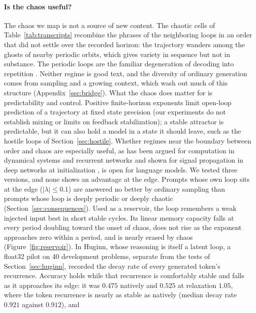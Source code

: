 \documentclass[11pt,letterpaper]{article}
\begin{document}
\paragraph{Is the chaos useful?} The chaos we map is not a source of new content. The chaotic cells of
Table~\ref{tab:transcripts} recombine the phrases of the neighboring loops in an order that did not settle over the recorded horizon: the
trajectory wanders among the ghosts of nearby periodic orbits, which gives variety in sequence but not in substance.
The periodic loops are the familiar degeneration of decoding into repetition
\cite{holtzman2019degeneration,xu2022loop}. Neither regime is good text, and the diversity of ordinary generation
comes from sampling and a growing context, which wash out much of this structure (Appendix~\ref{sec:bridge}). What
the chaos does matter for is predictability and control. Positive finite-horizon exponents limit open-loop
prediction of a trajectory at fixed state precision (our experiments do not establish mixing or limits on feedback
stabilization); a stable attractor is predictable, but it can also hold a model in a state it should leave, such as the hostile loops of Section~\ref{sec:hostile}. Whether regimes
near the boundary between order and chaos are especially useful, as has been argued for computation in dynamical
systems and recurrent networks \cite{langton1990computation,bertschinger2004realtime} and shown for signal propagation
in deep networks at initialization \cite{poole2016exponential,schoenholz2017deep}, is open for language models. We
tested three versions, and none shows an advantage at the edge. Prompts whose own loop sits at the edge
($|\lambda|\le0.1$) are answered no better by ordinary sampling than prompts whose loop is deeply periodic or deeply
chaotic (Section~\ref{sec:consequences}). Used as a reservoir, the loop remembers a weak injected input best in short
stable cycles. Its linear memory capacity falls at every period doubling toward the onset of chaos, does not rise as
the exponent approaches zero within a period, and is nearly erased by chaos (Figure~\ref{fig:reservoir}). In Huginn,
whose reasoning is itself a latent loop, a float32 pilot on 40 development problems, separate from the tests of
Section~\ref{sec:huginn}, recorded the decay rate of every generated token's recurrence. Accuracy holds while that
recurrence is comfortably stable and falls as it approaches its edge: it was $0.475$ natively and $0.525$ at relaxation
$1.05$, where the token recurrence is nearly as stable as natively (median decay rate $0.921$ against $0.912$), and
\end{document}
